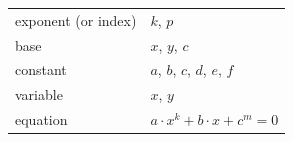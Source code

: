 {\begin{tabular}[t]{|l|l|}
        exponent (or index) &
        $k$, $p$%
     \tabularnewline\cline{1-1}\cline{2-2}
        base &
        $x$, $y$, $c$%
     \tabularnewline\cline{1-1}\cline{2-2}
        constant &
        $a$, $b$, $c$, $d$, $e$, $f$%
     \tabularnewline\cline{1-1}\cline{2-2}
        variable &
        $x$, $y$%
     \tabularnewline\cline{1-1}\cline{2-2}
        equation &
                  $a\ensuremath{\cdot}{x}^{k}+b\ensuremath{\cdot}x+{c}^{m}=0$

\end{tabular}}

